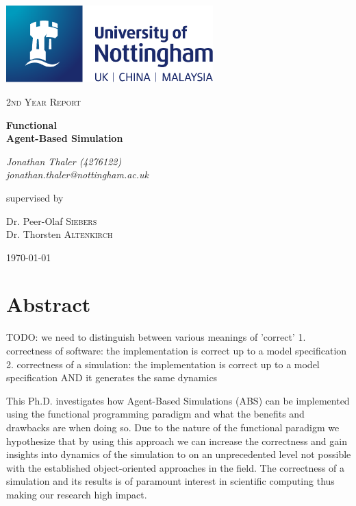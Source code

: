 \documentclass[oneside]{book}
\begin{document}
\begin{titlepage}
	\centering
	\includegraphics[width=0.60\textwidth]{./logo/UoN_Primary_Logo_RGB.png}\par\vspace{1cm}
	{\scshape\Large 2nd Year Report\par}
	\vspace{1.5cm}
	{\huge\bfseries Functional \\ Agent-Based Simulation\par}
	\vspace{2cm}
	{\Large\itshape Jonathan Thaler (4276122) \\ jonathan.thaler@nottingham.ac.uk \par}
	\vfill
	supervised by\par
	Dr. Peer-Olaf \textsc{Siebers} \\
	Dr. Thorsten \textsc{Altenkirch}

	\vfill

	{\large \today\par}
\end{titlepage}

\cleardoublepage

\section*{Abstract}
TODO: we need to distinguish between various meanings of 'correct'
1. correctness of software: the implementation is correct up to a model specification
2. correctness of a simulation: the implementation is correct up to a model specification AND it generates the same dynamics

This Ph.D. investigates how Agent-Based Simulations (ABS) can be implemented using the functional programming paradigm and what the benefits and drawbacks are when doing so. Due to the nature of the functional paradigm we hypothesize that by using this approach we can increase the correctness and gain insights into dynamics of the simulation to on an unprecedented level not possible with the established object-oriented approaches in the field. The correctness of a simulation and its results is of paramount interest in scientific computing thus making our research high impact.
\end{document}
